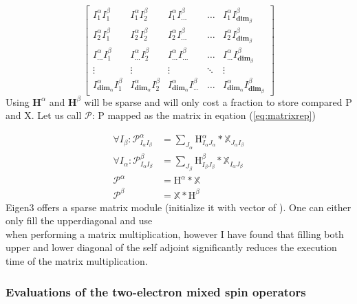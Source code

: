 \begin{equation}
\begin{bmatrix} \label{eq:matrixrep}
    I^{\alpha}_1 I^{\beta}_1 & I^{\alpha}_1 I^{\beta}_2  & I^{\alpha}_1 I^{\beta}_{...} & \dots  & I^{\alpha}_1 I^{\beta}_{\textbf{dim}_\beta} \\
    I^{\alpha}_2 I^{\beta}_1 & I^{\alpha}_2 I^{\beta}_2  & I^{\alpha}_2 I^{\beta}_{...} & \dots  & I^{\alpha}_2 I^{\beta}_{\textbf{dim}_\beta} \\
    I^{\alpha}_{...} I^{\beta}_1 & I^{\alpha}_{...} I^{\beta}_2  & I^{\alpha}_{...} I^{\beta}_{...} & \dots  & I^{\alpha}_{...} I^{\beta}_{\textbf{dim}_\beta} \\
    \vdots & \vdots & \vdots & \ddots & \vdots \\
    I^{\alpha}_{\textbf{dim}_\alpha} I^{\beta}_1 & I^{\alpha}_{\textbf{dim}_\alpha} I^{\beta}_2  & I^{\alpha}_{\textbf{dim}_\alpha} I^{\beta}_{...} & \dots  &
    I^{\alpha}_{\textbf{dim}_\alpha} I^{\beta}_{\textbf{dim}_\beta}
\end{bmatrix}
\end{equation}
Using $\textbf{H}^{\alpha}$ and $\textbf{H}^{\beta}$ will be sparse and will only cost a fraction to store compared P and X.
Let us call $\mathcal{P}$: P mapped as the matrix in eqation (\ref{eq:matrixrep})

\begin{align}
    \forall I_\beta: \mathcal{P}^{\alpha}_{I_\alpha I_\beta} & = \sum_{J_\alpha} \text{H}^{\alpha}_{I_\alpha J_\alpha} * \mathbb{X}_{J_\alpha I_\beta} \\
    \forall I_\alpha: \mathcal{P}^{\beta}_{I_\alpha  I_\beta} & = \sum_{J_\beta} \text{H}^{\beta}_{I_\beta J_\beta} * \mathbb{X}_{I_\alpha J_\beta} \\
   \mathcal{P}^\alpha & = \text{H}^{\alpha} * \mathbb{X} \\
  \mathcal{P}^\beta & = \mathbb{X} * \text{H}^{\beta}
\end{align}
Eigen3 offers a sparse matrix module (initialize it with vector of ). One can either only fill the upperdiagonal and use
\\
when performing a matrix multiplication, however I have found that filling both upper and lower diagonal of the self adjoint  significantly reduces the execution time of the matrix multiplication.

\subsubsection{Evaluations of the two-electron mixed spin operators}

